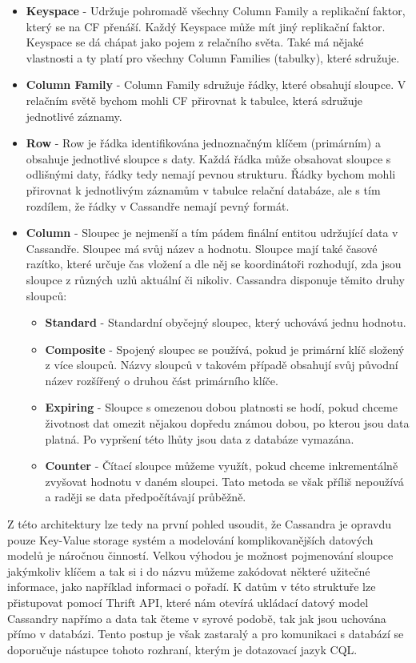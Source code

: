 \begin{itemize}
\item \textbf{Keyspace} - Udržuje pohromadě všechny Column Family a replikační faktor, který se na CF přenáší. Každý Keyspace může mít jiný replikační faktor. Keyspace se dá chápat jako pojem  z relačního světa. Také má nějaké vlastnosti a ty platí pro všechny Column Families (tabulky), které sdružuje.
\item \textbf{Column Family} - Column Family sdružuje řádky, které obsahují sloupce. V relačním světě bychom mohli CF přirovnat k tabulce, která sdružuje jednotlivé záznamy. 
\item \textbf{Row} - Row je řádka identifikována jednoznačným klíčem (primárním) a obsahuje jednotlivé sloupce s daty. Každá řádka může obsahovat sloupce s odlišnými daty, řádky tedy nemají pevnou strukturu. Řádky bychom mohli přirovnat k jednotlivým záznamům v tabulce relační databáze, ale s tím rozdílem, že řádky v Cassandře nemají pevný formát. 
\item \textbf{Column} - Sloupec je nejmenší a tím pádem finální entitou udržující data v Cassandře. Sloupec má svůj název a hodnotu. Sloupce mají také časové razítko, které určuje čas vložení a dle něj se koordinátoři rozhodují, zda jsou sloupce z různých uzlů aktuální či nikoliv. Cassandra disponuje těmito druhy sloupců:

\begin{itemize}
\item \textbf{Standard} - Standardní obyčejný sloupec, který uchovává jednu hodnotu.
\item \textbf{Composite} - Spojený sloupec se používá, pokud je primární klíč složený z více sloupců. Názvy sloupců v takovém případě obsahují svůj původní název rozšířený o druhou část primárního klíče. 
\item \textbf{Expiring} - Sloupce s omezenou dobou platnosti se hodí, pokud chceme životnost dat omezit nějakou dopředu známou dobou, po kterou jsou data platná. Po vypršení této lhůty jsou data z databáze vymazána.
\item \textbf{Counter} - Čítací sloupce můžeme využít, pokud chceme inkrementálně zvyšovat hodnotu v daném sloupci. Tato metoda se však příliš nepoužívá a raději se data předpočítávají průběžně. 
\end{itemize}
\end{itemize}



Z této architektury lze tedy na první pohled usoudit, že Cassandra je opravdu pouze Key-Value storage systém a modelování komplikovanějších datových modelů je náročnou činností. Velkou výhodou je možnost pojmenování sloupce jakýmkoliv klíčem a tak si i do názvu můžeme zakódovat některé užitečné informace, jako například informaci o pořadí. K datům v této struktuře lze přistupovat pomocí Thrift API, které nám otevírá ukládací datový model Cassandry napřímo a data tak čteme v syrové podobě, tak jak jsou uchována přímo v databázi. Tento postup je však zastaralý a pro komunikaci s databází se doporučuje nástupce tohoto rozhraní, kterým je dotazovací jazyk CQL. 


